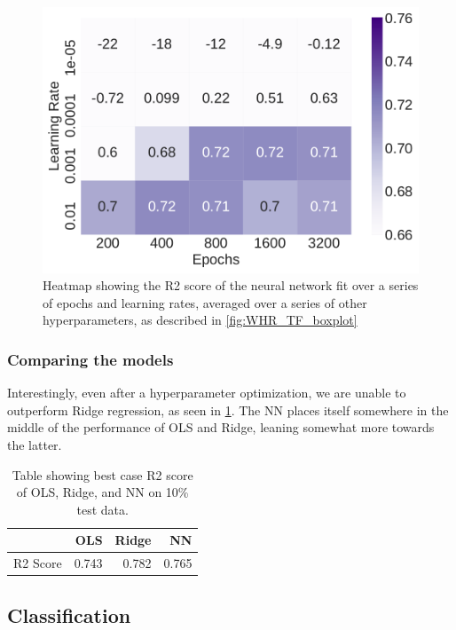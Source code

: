 \documentclass[10pt, twocolumn]{article}
\begin{document}
\begin{figure}[H]
    \centering
    \includegraphics[scale=0.4]{../figs/WHR_TF_lr_epoch_heatmap.pdf}
    \caption{Heatmap showing the R2 score of the neural network fit over a series of epochs and learning rates, averaged over a series of other hyperparameters, as described in \cref{fig:WHR_TF_boxplot}}
    \label{fig:WHR_TF_lr_epoch_heatmap}
\end{figure}


\subsubsection{Comparing the models}
Interestingly, even after a hyperparameter optimization, we are unable to outperform Ridge regression, as seen in \cref{tab:WHR_comparison}. The NN places itself somewhere in the middle of the performance of OLS and Ridge, leaning somewhat more towards the latter. 

\begin{table}[H]
    \centering
    \begin{tabular}{r r r r}
                 & OLS   & Ridge  &  NN \\
                 \hline
    R2 Score     & 0.743 & 0.782  &  0.765
    \end{tabular}
    \caption{Table showing best case R2 score of OLS, Ridge, and NN on 10\% test data.}
    \label{tab:WHR_comparison}
\end{table}

\subsection{Classification}
\end{document}
